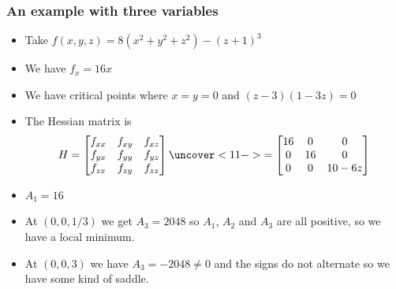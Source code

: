 \documentclass[9pt]{beamer}
\begin{document}
\begin{frame}
 \frametitle{An example with three variables}
 
 \begin{itemize}
  \item<1-> Take $f(x,y,z)=8(x^2+y^2+z^2)-(z+1)^3$
  \item<2-> We have $f_x=16x$
  \item<8-> We have critical points where $x=y=0$ and
   $(z-3)(1-3z)=0$ 
  \item<10-> The Hessian matrix is 
   \[ H = \bbm f_{xx} & f_{xy} & f_{xz} \\
               f_{yx} & f_{yy} & f_{yz} \\
               f_{zx} & f_{zy} & f_{zz} \ebm 
      \uncover<11->{=
          \bbm 16 & 0  & 0 \\
               0  & 16 & 0 \\
               0  & 0  & 10-6z \ebm}
   \]
  \item<12-> $A_1=16$  
  \item<15-> At $(0,0,1/3)$ we get $A_3=2048$ so $A_1$, $A_2$ and
   $A_3$ are all positive, so we have a local minimum.
  \item<16-> At $(0,0,3)$ we have $A_3=-2048\neq 0$ and the signs
   do not alternate so we have some kind of saddle.
 \end{itemize}
\end{frame}
\end{document}
